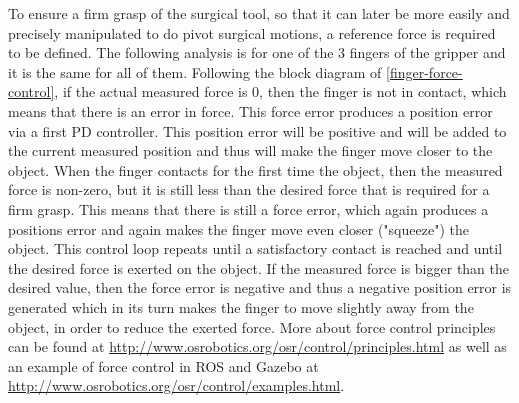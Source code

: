 To ensure a firm grasp of the surgical tool, so that it can later be more easily and precisely manipulated to do pivot surgical motions, a reference force is required to be defined. The following analysis is 
for one of the 3 fingers of the gripper and it is the same for all of them. Following the block diagram of \ref{finger-force-control}, if the actual measured force is 0, then the finger is not in contact, which means that 
there is an error in force. This force error produces a position error via a first PD controller. This position error will be positive and will be added to the current measured position and thus will make the finger move 
closer to the object. When the finger contacts for the first time the object, then the measured force is non-zero, 
but it is still less than the desired force that is required for a firm grasp. This means that there is still a force error, which again produces a positions error and again makes the finger move even closer ("squeeze") the 
object. This control loop repeats until a satisfactory contact is reached and until the desired force is exerted on the object. If the measured force is bigger than the desired value, then the force error is negative and thus
a negative position error is generated which in its turn makes the finger to move slightly away from the object, in order to reduce the exerted force. More about force control principles can be found at 
\url{http://www.osrobotics.org/osr/control/principles.html} as well as an example of force control in ROS and Gazebo at \url{http://www.osrobotics.org/osr/control/examples.html}.